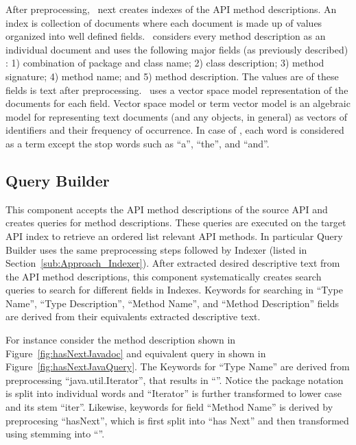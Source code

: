 After preprocessing, \tool\ next creates indexes of the API method descriptions.
An index is collection of documents where each document is made up of 
values organized into well defined fields.
\tool\ considers every method description as an individual document and 
uses the following major fields (as previously described) :
1) combination of package and class name;
2) class description;
3) method signature;
4) method name; and
5) method description.
The values are of these fields is text after preprocessing.
\tool\ uses a vector space model representation of the documents for each field. 
Vector space model or term vector model is an algebraic model for representing text documents (and any objects, in general) as vectors of identifiers and their frequency of occurrence. 
In case of \tool, each word is considered as a term except the stop words such as ``a'', ``the'', and ``and''.


  

\subsection{Query Builder}
\label{sub:Approach_Searcher}

This component accepts the API method descriptions of the source API
and creates queries for method descriptions.
These queries are executed on the target API index to retrieve 
an ordered list relevant API methods.
In particular Query Builder uses the same preprocessing steps followed by Indexer
(listed in Section~\ref{sub:Approach_Indexer}).
After extracted desired descriptive text from the API method descriptions,
this component systematically creates search queries to search for different fields in Indexes.
Keywords for searching in ``Type Name'', ``Type Description'', ``Method Name'', and ``Method Description'' fields are derived from their equivalents extracted descriptive text.


For instance consider the method description shown in  Figure~\ref{fig:hasNextJavadoc} 
and equivalent query in shown in Figure~\ref{fig:hasNextJavaQuery}.
The Keywords for ``Type Name'' are derived from preprocessing ``java.util.Iterator'', that results in ``''. Notice the package notation is split into individual words and ``Iterator'' is further transformed to lower case and its stem ``iter''.
Likewise, keywords for field ``Method Name'' is derived by preprocesing ``hasNext'', which is first split into ``has Next'' and then transformed using stemming into ``''.

